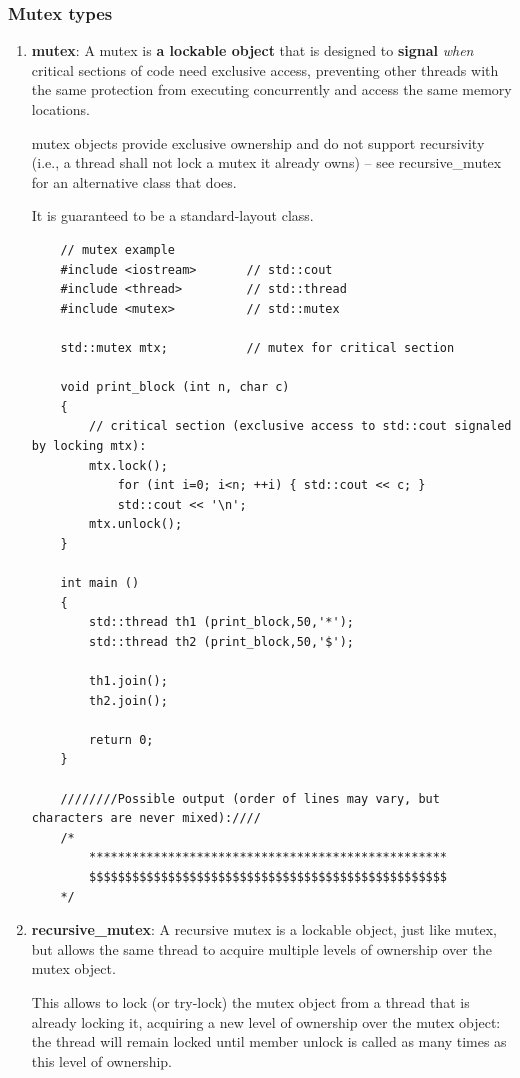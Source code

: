 \documentclass[UTF8,a4paper,12pt]{ctexbook}
\begin{document}
		\subsubsection{Mutex types}
			\begin{enumerate}[itemindent = 1em]
				\item \textbf{mutex}:
				A mutex is \textbf{a lockable object} that is designed to \textbf{signal} \textit{when} critical sections of code need exclusive access, preventing other threads with the same protection from executing concurrently and access the same memory locations.
				
				mutex objects provide exclusive ownership and do not support recursivity (i.e., a thread shall not lock a mutex it already owns) -- see recursive\_mutex for an alternative class that does.
				
				It is guaranteed to be a standard-layout class.
\begin{lstlisting}
	// mutex example
	#include <iostream>       // std::cout
	#include <thread>         // std::thread
	#include <mutex>          // std::mutex
	
	std::mutex mtx;           // mutex for critical section
	
	void print_block (int n, char c)
	{
		// critical section (exclusive access to std::cout signaled by locking mtx):
		mtx.lock();
			for (int i=0; i<n; ++i) { std::cout << c; }
			std::cout << '\n';
		mtx.unlock();
	}
	
	int main ()
	{
		std::thread th1 (print_block,50,'*');
		std::thread th2 (print_block,50,'$');
		
		th1.join();
		th2.join();
		
		return 0;
	}
	
	////////Possible output (order of lines may vary, but characters are never mixed):////
	/*
		**************************************************
		$$$$$$$$$$$$$$$$$$$$$$$$$$$$$$$$$$$$$$$$$$$$$$$$$$
	*/
\end{lstlisting}
				\item \textbf{recursive\_mutex}:
					A recursive mutex is a lockable object, just like mutex, but allows the same thread to acquire multiple levels of ownership over the mutex object.
					
					This allows to lock (or try-lock) the mutex object from a thread that is already locking it, acquiring a new level of ownership over the mutex object: the thread will remain locked until member unlock is called as many times as this level of ownership.
					

\end{enumerate}
\end{document}
